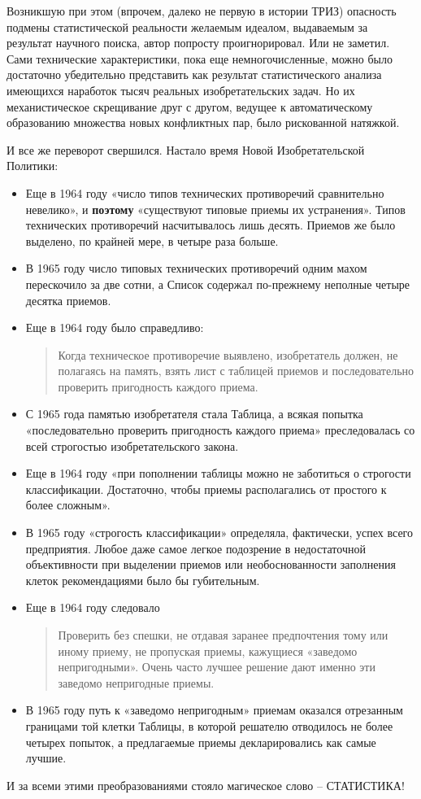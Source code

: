 \documentclass[11pt,a4paper]{article}
\begin{document}
Возникшую при этом (впрочем, далеко не первую в истории ТРИЗ) опасность
подмены статистической реальности желаемым идеалом, выдаваемым за результат
научного поиска, автор попросту проигнорировал. Или не заметил. Сами
технические характеристики, пока еще немногочисленные, можно было достаточно
убедительно представить как результат статистического анализа имеющихся
наработок тысяч реальных изобретательских задач. Но их механистическое
скрещивание друг с другом, ведущее к автоматическому образованию множества
новых конфликтных пар, было рискованной натяжкой.

И все же переворот свершился. Настало время Новой Изобретательской Политики:
\begin{itemize}
\item Еще в 1964 году «число типов технических противоречий сравнительно
  невелико», и \textbf{поэтому} «существуют типовые приемы их устранения».
  Типов технических противоречий насчитывалось лишь десять. Приемов же было
  выделено, по крайней мере, в четыре раза больше.
\item В 1965 году число типовых технических противоречий одним махом
  перескочило за две сотни, а Список содержал по-прежнему неполные четыре
  десятка приемов.
\item Еще в 1964 году было справедливо: 
  \begin{quote}
    Когда техническое противоречие выявлено, изобретатель должен, не полагаясь
    на память, взять лист с таблицей приемов и последовательно проверить
    пригодность каждого приема. \cite{Altshuller1961}
  \end{quote}
\item С 1965 года памятью изобретателя стала Таблица, а всякая попытка
  «последовательно проверить пригодность каждого приема» преследовалась со
  всей строгостью изобретательского закона.
\item Еще в 1964 году «при пополнении таблицы можно не заботиться о строгости
  классификации. Достаточно, чтобы приемы располагались от простого к более
  сложным».
\item В 1965 году «строгость классификации» определяла, фактически, успех
  всего предприятия. Любое даже самое легкое подозрение в недостаточной
  объективности при выделении приемов или необоснованности заполнения клеток
  рекомендациями было бы губительным.
\item Еще в 1964 году следовало 
  \begin{quote}
    Проверить без спешки, не отдавая заранее предпочтения тому или иному
    приему, не пропуская приемы, кажущиеся «заведомо непригодными». Очень
    часто лучшее решение дают именно эти заведомо непригодные приемы.
  \end{quote}
\item В 1965 году путь к «заведомо непригодным» приемам оказался отрезанным
  границами той клетки Таблицы, в которой решателю отводилось не более четырех
  попыток, а предлагаемые приемы декларировались как самые лучшие.
\end{itemize}
И за всеми этими преобразованиями стояло магическое слово -- СТАТИСТИКА!
\end{document}
